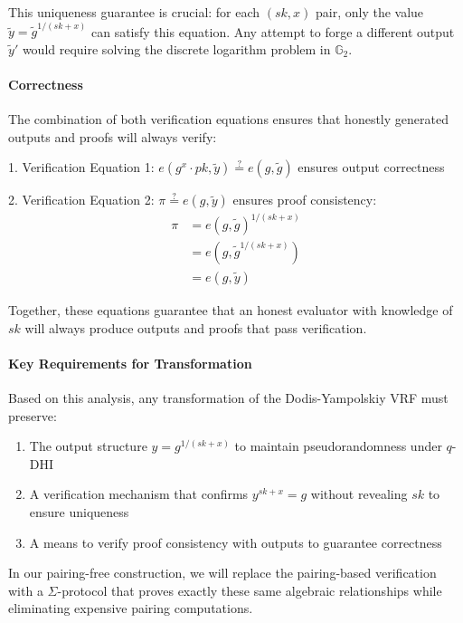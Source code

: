 This uniqueness guarantee is crucial: for each $(sk,x)$ pair, only the value $\tilde{y} = \tilde{g}^{1/(sk+x)}$ can satisfy this equation. Any attempt to forge a different output $\tilde{y}'$ would require solving the discrete logarithm problem in $\mathbb{G}_2$.

\paragraph{Correctness}
The combination of both verification equations ensures that honestly generated outputs and proofs will always verify:

1. Verification Equation 1: $e(g^{x} \cdot pk, \tilde{y}) \stackrel{?}{=} e(g, \tilde{g})$ ensures output correctness

2. Verification Equation 2: $\pi \stackrel{?}{=} e(g, \tilde{y})$ ensures proof consistency:
\begin{align*}
    \pi &= e(g, \tilde{g})^{1/(sk + x)} \\
    &= e(g, \tilde{g}^{1/(sk + x)}) \\
    &= e(g, \tilde{y})
\end{align*}

Together, these equations guarantee that an honest evaluator with knowledge of $sk$ will always produce outputs and proofs that pass verification.

\paragraph{Key Requirements for Transformation}
Based on this analysis, any transformation of the Dodis-Yampolskiy VRF must preserve:

\begin{enumerate}
    \item The output structure $y = g^{1/(sk+x)}$ to maintain pseudorandomness under $q$-DHI
    
    \item A verification mechanism that confirms $y^{sk+x} = g$ without revealing $sk$ to ensure uniqueness
    
    \item A means to verify proof consistency with outputs to guarantee correctness
\end{enumerate}

In our pairing-free construction, we will replace the pairing-based verification with a $\Sigma$-protocol that proves exactly these same algebraic relationships while eliminating expensive pairing computations.

































